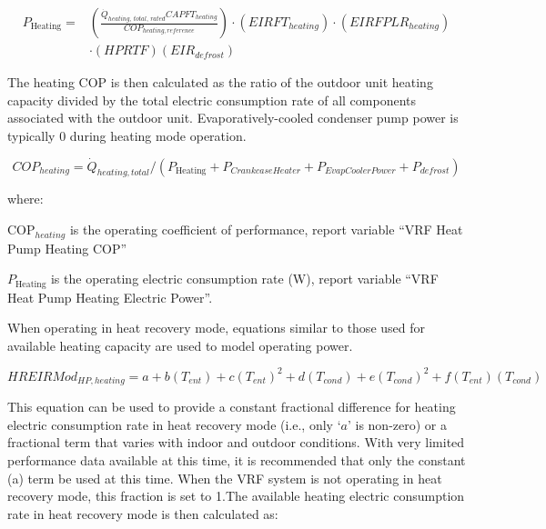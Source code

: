 \begin{equation}
\begin{array}{rl}
  P_{\mathrm{Heating}} =& \left( \frac{\dot{Q}_{heating,\,total,\,rated} CAPFT_{heating}}{COP_{heating,reference}} \right) \cdot \left( EIRFT_{heating} \right) \cdot \left( EIRFPLR_{heating} \right) \\
  & \cdot \left( HPRTF \right) \left( EIR_{defrost} \right)
\end{array}
\end{equation}

The heating COP is then calculated as the ratio of the outdoor unit heating capacity divided by the total electric consumption rate of all components associated with the outdoor unit. Evaporatively-cooled condenser pump power is typically 0 during heating mode operation.

\begin{equation}
  COP_{heating} = \dot{Q}_{heating,total} / \left( P_{\mathrm{Heating}} + P_{CrankcaseHeater} + P_{EvapCoolerPower} + P_{defrost} \right)
\end{equation}

where:

COP\(_{heating}\) is the operating coefficient of performance, report variable ``VRF Heat Pump Heating COP''

$P_{\mathrm{Heating}}$ is the operating electric consumption rate (W), report variable ``VRF Heat Pump Heating Electric Power''.

When operating in heat recovery mode, equations similar to those used for available heating capacity are used to model operating power.

\begin{equation}
  HREIRMod_{HP,heating} = a + b \left( T_{ent} \right) + c \left( T_{ent} \right)^2 + d \left( T_{cond} \right) + e \left( T_{cond} \right)^2 + f \left( T_{ent} \right) \left( T_{cond} \right)
\end{equation}

This equation can be used to provide a constant fractional difference for heating electric consumption rate in heat recovery mode (i.e., only `$a$' is non-zero) or a fractional term that varies with indoor and outdoor conditions. With very limited performance data available at this time, it is recommended that only the constant (a) term be used at this time. When the VRF system is not operating in heat recovery mode, this fraction is set to 1.The available heating electric consumption rate in heat recovery mode is then calculated as:

